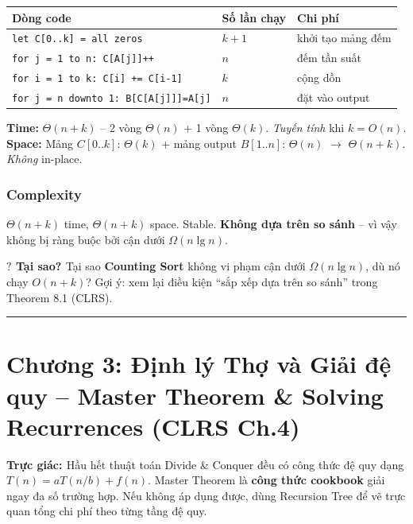 \documentclass[10pt]{article}
\newcommand{\intuition}[1]{%
  \begin{tcolorbox}[colback=blue!5!white, colframe=blue!60!white, leftrule=3pt,
    toprule=0pt, bottomrule=0pt, rightrule=0pt,
    boxsep=2pt, left=6pt, right=6pt, top=4pt, bottom=4pt]
  \small\textbf{\textcolor{blue!80!black}{Trực giác: }}#1
  \end{tcolorbox}}
\newcommand{\whyprompt}[1]{%
  \begin{tcolorbox}[colback=yellow!8!white, colframe=orange!70!yellow, leftrule=3pt,
    toprule=0pt, bottomrule=0pt, rightrule=0pt,
    boxsep=2pt, left=6pt, right=6pt, top=4pt, bottom=4pt]
  {\small\textbf{\textcolor{orange!80!black}{$\boldsymbol{?}$ Tại sao? }} #1}
  \end{tcolorbox}}
\begin{document}
\begin{tcolorbox}[colback=yellow!5, colframe=orange!50, boxrule=0.5pt, arc=2pt, title={\small\textbf{Phân tích Complexity -- Counting Sort}}]
\begin{tabular}{|l|l|l|}
\hline
\textbf{Dòng code} & \textbf{Số lần chạy} & \textbf{Chi phí} \\
\hline
\texttt{let C[0..k] = all zeros} & $k+1$ & khởi tạo mảng đếm \\
\hline
\texttt{for j = 1 to n: C[A[j]]++} & $n$ & đếm tần suất \\
\hline
\texttt{for i = 1 to k: C[i] += C[i-1]} & $k$ & cộng dồn \\
\hline
\texttt{for j = n downto 1: B[C[A[j]]]=A[j]} & $n$ & đặt vào output \\
\hline
\end{tabular}
\vspace{0.2cm}

\textbf{Time:} $\Theta(n+k)$ -- 2 vòng $\Theta(n)$ + 1 vòng $\Theta(k)$. \textit{Tuyến tính} khi $k=O(n)$.\\
\textbf{Space:} Mảng $C[0..k]$: $\Theta(k)$ + mảng output $B[1..n]$: $\Theta(n)$ $\to$ $\Theta(n+k)$. \textit{Không} in-place.
\end{tcolorbox}

\subsubsection{Complexity}
$\Theta(n + k)$ time, $\Theta(n + k)$ space. Stable. \textbf{Không dựa trên so sánh} -- vì vậy không bị ràng buộc bởi cận dưới $\Omega(n \lg n)$.

\whyprompt{Tại sao \textbf{Counting Sort} không vi phạm cận dưới $\Omega(n \lg n)$, dù nó chạy $O(n+k)$? Gợi ý: xem lại điều kiện ``sắp xếp dựa trên so sánh'' trong Theorem 8.1 (CLRS).}

\begin{center}\rule{0.5\linewidth}{0.5pt}\end{center}

\section{Chương 3: Định lý Thợ và Giải đệ quy -- Master Theorem \& Solving Recurrences (CLRS Ch.4)}\label{chux1b0ux1a1ng-3-master-theorem-giux1ea3i-ux111ux1ec7-quy-clrs-ch.4}

\intuition{Hầu hết thuật toán Divide \& Conquer đều có công thức đệ quy dạng $T(n) = aT(n/b) + f(n)$. Master Theorem là \textbf{công thức cookbook} giải ngay đa số trường hợp. Nếu không áp dụng được, dùng Recursion Tree để vẽ trực quan tổng chi phí theo từng tầng đệ quy.}
\end{document}
